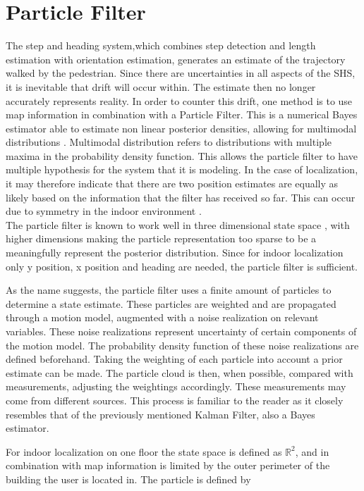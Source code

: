 \section{Particle Filter}
\label{sec:method-pf}
The step and heading system,which combines step detection and length estimation with orientation estimation, generates an estimate of the trajectory walked by the pedestrian. Since there are uncertainties in all aspects of the SHS, it is inevitable that drift will occur within. The estimate then no longer accurately represents reality. In order to counter this drift, one method is to use map information in combination with a Particle Filter. This is a numerical Bayes estimator able to estimate non linear posterior densities, allowing for multimodal distributions \cite{gustafsson2010particle,kihlberg2012map}. Multimodal distribution refers to distributions with multiple maxima in the probability density function. This allows the particle filter to have multiple hypothesis for the system that it is modeling. In the case of localization, it may therefore indicate that there are two position estimates are equally as likely based on the information that the filter has received so far. This can occur due to symmetry in the indoor environment \cite{Woodman2008}. \\
The particle filter is known to work well in three dimensional state space \cite{gustafsson2010particle}, with higher dimensions making the particle representation too sparse to be a meaningfully represent the posterior distribution. Since for indoor localization only y position, x position and heading are needed, the particle filter is sufficient.
\par
As the name suggests, the particle filter uses a finite amount of particles to determine a state estimate. These particles are weighted and are propagated through a motion model, augmented with a noise realization on relevant variables. These noise realizations represent uncertainty of certain components of the motion model. The probability density function of these noise realizations are defined beforehand. Taking the weighting of each particle into account a prior estimate can be made. The particle cloud is then, when possible, compared with measurements, adjusting the weightings accordingly. These measurements may come from different sources. This process is familiar to the reader as it closely resembles that of the previously mentioned Kalman Filter, also a Bayes estimator.\par
For indoor localization on one floor the state space is defined as $\mathbb{R}^{2}$, and in combination with map information is limited by the outer perimeter of the building the user is located in. The particle is defined by 

